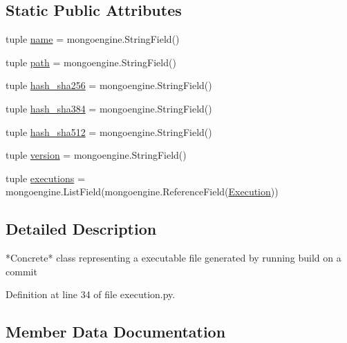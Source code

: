 \subsection*{Static Public Attributes}
\begin{DoxyCompactItemize}
\item 
tuple \hyperlink{classmemoryoracle_1_1execution_1_1Executable_a52369e49bc4e8eea72149649accd2650}{name} = mongoengine.\+String\+Field()
\item 
tuple \hyperlink{classmemoryoracle_1_1execution_1_1Executable_a783237790a0dde89a8d29c2c56983303}{path} = mongoengine.\+String\+Field()
\item 
tuple \hyperlink{classmemoryoracle_1_1execution_1_1Executable_af209643fc8bba25bb96282463a2274d7}{hash\+\_\+sha256} = mongoengine.\+String\+Field()
\item 
tuple \hyperlink{classmemoryoracle_1_1execution_1_1Executable_aaa57eabb3dec08378d484a6f7f519fe2}{hash\+\_\+sha384} = mongoengine.\+String\+Field()
\item 
tuple \hyperlink{classmemoryoracle_1_1execution_1_1Executable_afd44dfe3eb583f3c185b66a619e7923b}{hash\+\_\+sha512} = mongoengine.\+String\+Field()
\item 
tuple \hyperlink{classmemoryoracle_1_1execution_1_1Executable_a7ef44544b8c9b148bf066357bfa37f92}{version} = mongoengine.\+String\+Field()
\item 
tuple \hyperlink{classmemoryoracle_1_1execution_1_1Executable_a445e571531520c3ec32754988b4d7ee6}{executions} = mongoengine.\+List\+Field(mongoengine.\+Reference\+Field(\hyperlink{classmemoryoracle_1_1execution_1_1Execution}{Execution}))
\end{DoxyCompactItemize}


\subsection{Detailed Description}
\begin{DoxyVerb}*Concrete* class representing a executable file generated by running
build on a commit
\end{DoxyVerb}
 

Definition at line 34 of file execution.\+py.



\subsection{Member Data Documentation}
\hypertarget{classmemoryoracle_1_1execution_1_1Executable_a445e571531520c3ec32754988b4d7ee6}{}

